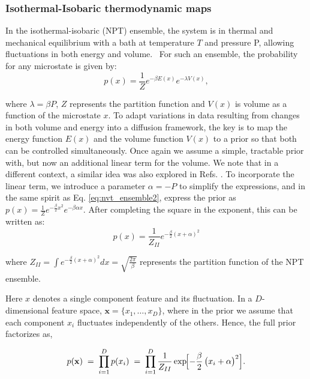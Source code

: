 \documentclass[aip,jcp,reprint,longbibliography]{revtex4-1}
\begin{document}
\subsubsection{Isothermal-Isobaric thermodynamic maps}
\label{sec:expTM_NPT}
In the isothermal-isobaric (NPT) ensemble, the system is in thermal and mechanical equilibrium with a bath at temperature $T$ and pressure P, allowing fluctuations in both energy and volume.~\cite{Chandler1985Introduction} For such an ensemble, the probability for any microstate is given by: 
\begin{equation}
    p(x) = \frac{1}{Z} e^{-\beta E(x)} e^{-\lambda V(x)},
\end{equation}

\noindent where $\lambda = \beta P$, $Z$ represents the partition function and $V(x)$ is volume as a function of the microstate $x$. To adapt variations in data resulting from changes in both volume and energy into a diffusion framework, the key is to map the energy function $ E(x) $ and the volume function $ V(x) $ to a prior so that both can be controlled simultaneously. Once again we assume a simple, tractable prior with, but now an additional linear term for the volume. We note that in a different context, a similar idea was also explored in Refs. . 
To incorporate the linear term, we introduce a parameter $\alpha =- P$  to simplify the expressions, and in the same spirit as Eq. \ref{eq:nvt_ensemble2}, express the prior as $p(x) = \frac{1}{Z} e^{-\frac{\beta}{2} x^2} e^{- \beta \alpha x}$. After completing the square in the exponent, this can be written as:
\begin{equation}
    p(x) =  \frac{1}{Z_{II}} e^{-\frac{\beta}{2}\left( x + \alpha \right)^2}
\label{eq:NPT probabilbity}
\end{equation}


\noindent where $Z_{II} = \int e^{-\frac{\beta}{2} \left( x + \alpha \right)^2} dx =\sqrt{\frac{2\pi}{\beta}}$  represents the partition function of the NPT ensemble. 


Here $x$ denotes a single component feature and its fluctuation. In a  $D$-dimensional feature space,  $\mathbf{x} =  \{ x_1, \ldots, x_D\}$, where in the prior we assume that each component $x_i$  fluctuates independently of the others. Hence, the full prior factorizes as, 

\begin{equation}
    p(\mathbf{x}) \;=\; \prod_{i=1}^D p(x_i) 
    \;=\; \prod_{i=1}^D \frac{1}{Z_{II}} 
      \exp\!\Bigl[-\frac{\beta}{2} \,\bigl(x_i + \alpha\bigr)^2\Bigr].
\label{eq:NPT probability vector1}
\end{equation}
\end{document}
